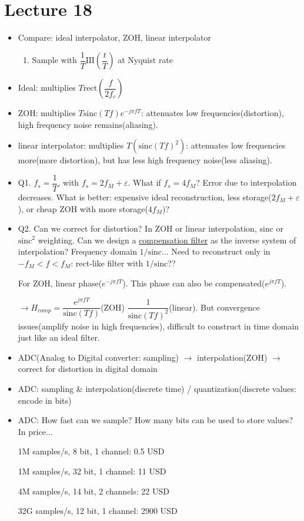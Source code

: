 \documentclass{article}
\newcommand{\shah}[1]{\mathrm{III}\left(#1\right)}
\newcommand{\rect}[1]{\mathrm{rect}\left(#1\right)}
\newcommand{\sinc}[1]{\mathrm{sinc}\left(#1\right)}
\begin{document}
\section{Lecture 18}
\begin{itemize}
    \item Compare: ideal interpolator, ZOH, linear interpolator
    \begin{enumerate}
        \item Sample with $\dfrac{1}{T}\shah{\dfrac{t}{T}}$ at Nyquist rate
    \end{enumerate} 
    \item Ideal: multiplies $T\rect{\dfrac{f}{2f_c}}$
    \item ZOH: multiplies $T\sinc{Tf}e^{-j\pi fT}$: attenuates low frequencies(distortion), high frequency noise remains(aliasing).
    \item linear interpolator: multiplies $T(\sinc{Tf}^2)$: attenuates low frequencies more(more distortion), but has less high frequency noise(less aliasing).
    \item Q1. $f_s=\dfrac{1}{T}$, with $f_s = 2f_M + \varepsilon$. What if $f_s = 4f_M$? Error due to interpolation decreases. What is better: expensive ideal reconstruction, less storage($2f_M+\varepsilon$), or cheap ZOH with more storage($4f_M$)?
    \item Q2. Can we correct for distortion? In ZOH or linear interpolation, $\mathrm{sinc}$ or $\mathrm{sinc}^2$ weighting. Can we design a \underline{compensation filter} as the inverse system of interpolation? Frequency domain $1/\mathrm{sinc}$... Need to reconstruct only in $-f_M < f < f_M$: rect-like filter with $1/\mathrm{sinc}$?? 
    
    For ZOH, linear phase($e^{-j\pi fT}$). This phase can also be compensated($e^{j\pi fT}$).
    
    $\rightarrow H_{comp} = \dfrac{e^{j\pi fT}}{\sinc{Tf}}$(ZOH) $\dfrac{1}{\sinc{Tf}^2}$(linear). But convergence issues(amplify noise in high frequencies), difficult to construct in time domain just like an ideal filter.
    
    \item ADC(Analog to Digital converter: sampling) $\rightarrow$ interpolation(ZOH) $\rightarrow$ correct for distortion in digital domain
    \item ADC: sampling \& interpolation(discrete time) / quantization(discrete values: encode in bits)
    \item ADC: How fast can we sample? How many bits can be used to store values? In price...
    
    1M samples/s, 8 bit, 1 channel: 0.5 USD
    
    1M samples/s, 32 bit, 1 channel: 11 USD
    
    4M samples/s, 14 bit, 2 channels: 22 USD
    
    32G samples/s, 12 bit, 1 channel: 2900 USD
\end{itemize}
\end{document}
